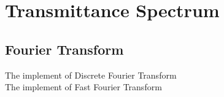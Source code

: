\section{Transmittance Spectrum}
\subsection{Fourier Transform}
The implement of Discrete Fourier Transform\\
The implement of Fast Fourier Transform
